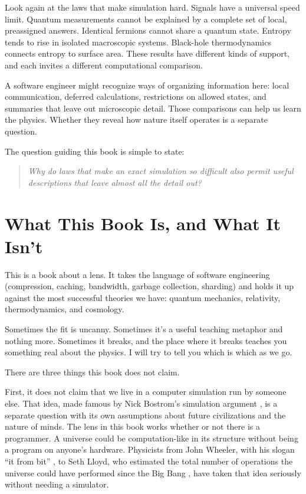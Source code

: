 Look again at the laws that make simulation hard. Signals have a universal speed limit. Quantum measurements cannot be explained by a complete set of local, preassigned answers. Identical fermions cannot share a quantum state. Entropy tends to rise in isolated macroscopic systems. Black-hole thermodynamics connects entropy to surface area. These results have different kinds of support, and each invites a different computational comparison.

A software engineer might recognize ways of organizing information here: local communication, deferred calculations, restrictions on allowed states, and summaries that leave out microscopic detail. Those comparisons can help us learn the physics. Whether they reveal how nature itself operates is a separate question.

The question guiding this book is simple to state:

\begin{quote}
\textit{Why do laws that make an exact simulation so difficult also permit useful descriptions that leave almost all the detail out?}
\end{quote}

\section{What This Book Is, and What It Isn't}

This is a book about a lens. It takes the language of software engineering (compression, caching, bandwidth, garbage collection, sharding) and holds it up against the most successful theories we have: quantum mechanics, relativity, thermodynamics, and cosmology.

Sometimes the fit is uncanny. Sometimes it's a useful teaching metaphor and nothing more. Sometimes it breaks, and the place where it breaks teaches you something real about the physics. I will try to tell you which is which as we go.

There are three things this book does not claim.

First, it does not claim that we live in a computer simulation run by someone else. That idea, made famous by Nick Bostrom's simulation argument \cite{bostrom2003}, is a separate question with its own assumptions about future civilizations and the nature of minds. The lens in this book works whether or not there is a programmer. A universe could be computation-like in its structure without being a program on anyone's hardware. Physicists from John Wheeler, with his slogan ``it from bit'' \cite{wheeler1990}, to Seth Lloyd, who estimated the total number of operations the universe could have performed since the Big Bang \cite{lloyd2002}, have taken that idea seriously without needing a simulator.

